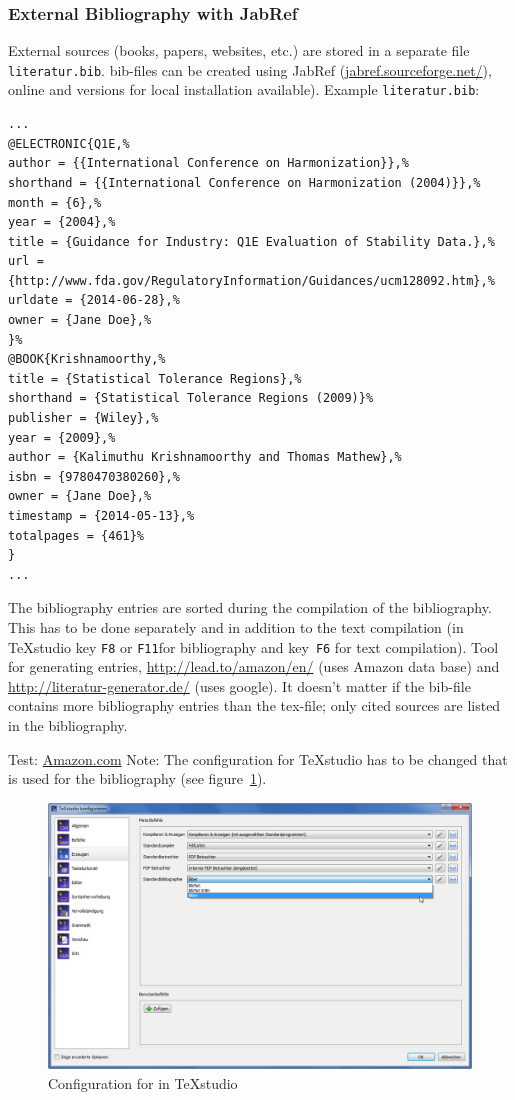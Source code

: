 \subsubsection{External Bibliography with JabRef}
External sources (books, papers, websites, etc.) are stored in a separate file \verb|literatur.bib|. bib-files
can be created using JabRef (\href{http://jabref.sourceforge.net/}{jabref.sourceforge.net/}), online and
versions for local installation available).
Example \verb|literatur.bib|:{\footnotesize
\begin{verbatim}
...
@ELECTRONIC{Q1E,%
author = {{International Conference on Harmonization}},%
shorthand = {{International Conference on Harmonization (2004)}},%
month = {6},%
year = {2004},%
title = {Guidance for Industry: Q1E Evaluation of Stability Data.},%
url = {http://www.fda.gov/RegulatoryInformation/Guidances/ucm128092.htm},%
urldate = {2014-06-28},%
owner = {Jane Doe},%
}%
@BOOK{Krishnamoorthy,%
title = {Statistical Tolerance Regions},%
shorthand = {Statistical Tolerance Regions (2009)}%
publisher = {Wiley},%
year = {2009},%
author = {Kalimuthu Krishnamoorthy and Thomas Mathew},%
isbn = {9780470380260},%
owner = {Jane Doe},%
timestamp = {2014-05-13},%
totalpages = {461}%
}
...
\end{verbatim}}

The bibliography entries are sorted during the compilation of the bibliography. This has to be done
separately and in addition to the text compilation (\eg in TeXstudio key \verb|F8| or \verb|F11|for bibliography and
key~\verb|F6| for text compilation). Tool for generating \BibTeX entries, \eg
\href{http://lead.to/amazon/en/}{http://lead.to/amazon/en/} (uses Amazon data base) and
\href{http://literatur-generator.de/}{http://literatur-generator.de/} (uses google). It doesn't matter if the
bib-file contains more bibliography entries than the tex-file; only cited sources are listed in the
bibliography.

Test: \href{http://amazon.com}{Amazon.com}
Note: The configuration for TeXstudio has to be changed that \biber is used for the bibliography (see figure~\ref{fig:TeXStudioBiber}).%
\begin{figure}[htb]
\centering
\includegraphics[width=\linewidth]{TeXStudioBiber}%
\caption{Configuration for \biber in TeXstudio}
\label{fig:TeXStudioBiber}
\end{figure}

